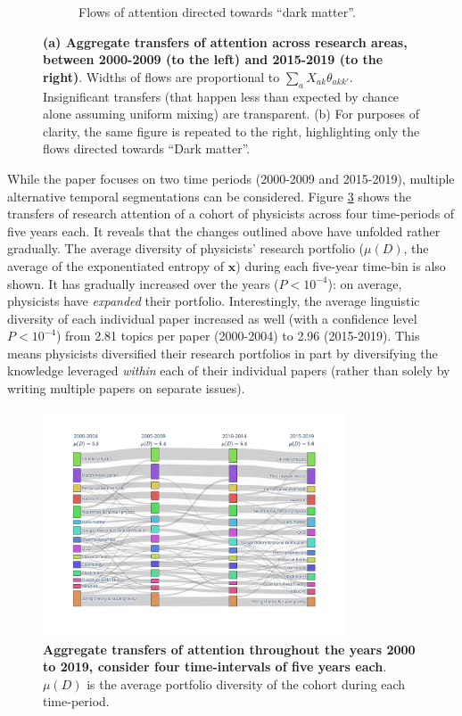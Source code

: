 \documentclass{article}
\begin{document}
\begin{figure}[h]
\begin{subfigure}[t]{0.47\textwidth}
    \caption{\label{fig:sankey_b}Flows of attention directed towards ``dark matter''.}
\end{subfigure}
     \caption{\textbf{(a) Aggregate transfers of attention across research areas, between 2000-2009 (to the left) and 2015-2019 (to the right)}. Widths of flows are proportional to $\sum_a X_{ak}\theta_{akk'}$. Insignificant transfers (that happen less than expected by chance alone assuming uniform mixing) are transparent. (b) For purposes of clarity, the same figure is repeated to the right, highlighting only the flows directed towards ``Dark matter''.}
     \label{fig:sankey}
 \end{figure}

While the paper focuses on two time periods (2000-2009 and 2015-2019), multiple alternative temporal segmentations can be considered. Figure \ref{fig:sankey_five_years} shows the transfers of research attention of a cohort of physicists across four time-periods of five years each. It reveals that the changes outlined above have unfolded rather gradually. The average diversity of physicists' research portfolio ($\mu(D)$, the average of the exponentiated entropy of $\bm{x}$) during each five-year time-bin is also shown. It has gradually increased over the years ($P<10^{-4}$): on average, physicists have \textit{expanded} their portfolio. Interestingly, the average linguistic diversity of each individual paper increased as well (with a confidence level $P<10^{-4}$) from 2.81 topics per paper (2000-2004) to 2.96 (2015-2019). This means physicists diversified their research portfolios in part by diversifying the knowledge leveraged \textit{within} each of their individual papers (rather than solely by writing multiple papers on separate issues).

\begin{figure}[!h]
    \centering
    \includegraphics[width=0.8\textwidth,trim={2.1cm 1.5cm 2.1cm 1.5cm},clip]{Fig5.pdf}
    \caption{\textbf{Aggregate transfers of attention throughout the years 2000 to 2019, consider four time-intervals of five years each}. $\mu(D)$ is the average portfolio diversity of the cohort during each time-period.}
    \label{fig:sankey_five_years}
\end{figure}
\end{document}
